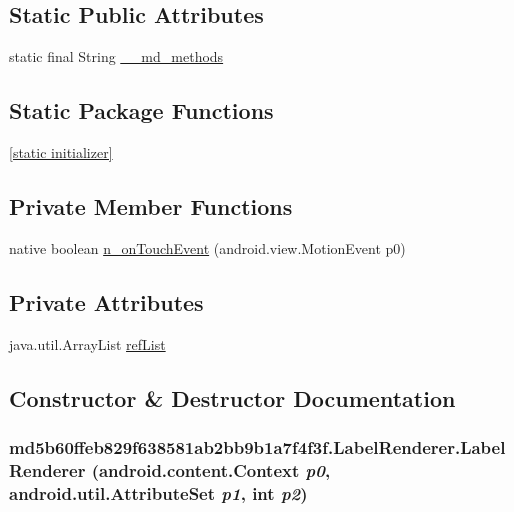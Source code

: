 \subsection*{Static Public Attributes}
\begin{CompactItemize}
\item 
static final String \hyperlink{classmd5b60ffeb829f638581ab2bb9b1a7f4f3f_1_1_label_renderer_6d75a8c95caaa11a9bbc9581bb0151b3}{\_\-\_\-md\_\-methods}
\end{CompactItemize}
\subsection*{Static Package Functions}
\begin{CompactItemize}
\item 
\hyperlink{classmd5b60ffeb829f638581ab2bb9b1a7f4f3f_1_1_label_renderer_af466d788901dafeebba7b0ebebc31a0}{\mbox{[}static initializer\mbox{]}}
\end{CompactItemize}
\subsection*{Private Member Functions}
\begin{CompactItemize}
\item 
native boolean \hyperlink{classmd5b60ffeb829f638581ab2bb9b1a7f4f3f_1_1_label_renderer_5d58dc5f8f8a367964cfd8fbd30be3f0}{n\_\-onTouchEvent} (android.view.MotionEvent p0)
\end{CompactItemize}
\subsection*{Private Attributes}
\begin{CompactItemize}
\item 
java.util.ArrayList \hyperlink{classmd5b60ffeb829f638581ab2bb9b1a7f4f3f_1_1_label_renderer_ff060607c57202cbc808598219736919}{refList}
\end{CompactItemize}


\subsection{Constructor \& Destructor Documentation}
\hypertarget{classmd5b60ffeb829f638581ab2bb9b1a7f4f3f_1_1_label_renderer_676d9f280baafbc8b1cd2f8d192d5420}{
\subsubsection[{LabelRenderer}]{\setlength{\rightskip}{0pt plus 5cm}md5b60ffeb829f638581ab2bb9b1a7f4f3f.LabelRenderer.LabelRenderer (android.content.Context {\em p0}, \/  android.util.AttributeSet {\em p1}, \/  int {\em p2})}}
\label{classmd5b60ffeb829f638581ab2bb9b1a7f4f3f_1_1_label_renderer_676d9f280baafbc8b1cd2f8d192d5420}


